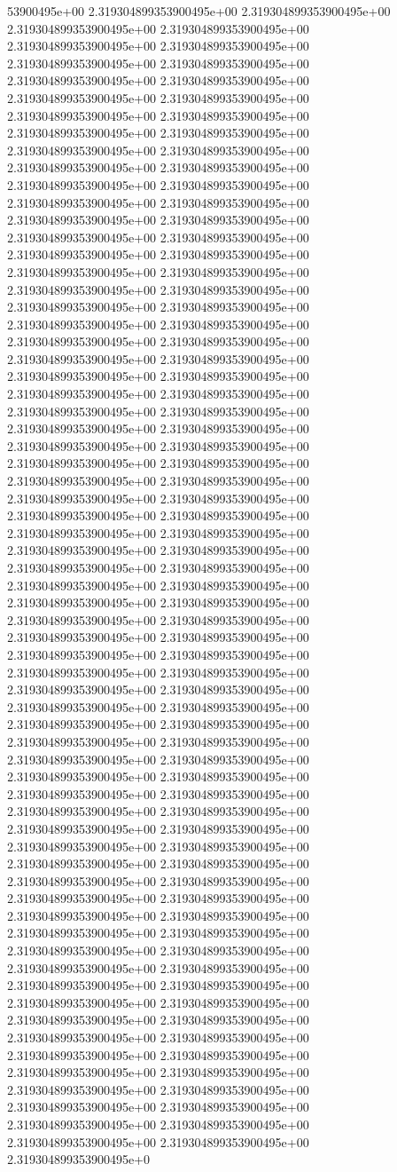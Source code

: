 53900495e+00	2.319304899353900495e+00	2.319304899353900495e+00	2.319304899353900495e+00	2.319304899353900495e+00	2.319304899353900495e+00	2.319304899353900495e+00	2.319304899353900495e+00	2.319304899353900495e+00	2.319304899353900495e+00	2.319304899353900495e+00	2.319304899353900495e+00	2.319304899353900495e+00	2.319304899353900495e+00	2.319304899353900495e+00	2.319304899353900495e+00	2.319304899353900495e+00	2.319304899353900495e+00	2.319304899353900495e+00	2.319304899353900495e+00	2.319304899353900495e+00	2.319304899353900495e+00	2.319304899353900495e+00	2.319304899353900495e+00	2.319304899353900495e+00	2.319304899353900495e+00	2.319304899353900495e+00	2.319304899353900495e+00	2.319304899353900495e+00	2.319304899353900495e+00	2.319304899353900495e+00	2.319304899353900495e+00	2.319304899353900495e+00	2.319304899353900495e+00	2.319304899353900495e+00	2.319304899353900495e+00	2.319304899353900495e+00	2.319304899353900495e+00	2.319304899353900495e+00	2.319304899353900495e+00	2.319304899353900495e+00	2.319304899353900495e+00	2.319304899353900495e+00	2.319304899353900495e+00	2.319304899353900495e+00	2.319304899353900495e+00	2.319304899353900495e+00	2.319304899353900495e+00	2.319304899353900495e+00	2.319304899353900495e+00	2.319304899353900495e+00	2.319304899353900495e+00	2.319304899353900495e+00	2.319304899353900495e+00	2.319304899353900495e+00	2.319304899353900495e+00	2.319304899353900495e+00	2.319304899353900495e+00	2.319304899353900495e+00	2.319304899353900495e+00	2.319304899353900495e+00	2.319304899353900495e+00	2.319304899353900495e+00	2.319304899353900495e+00	2.319304899353900495e+00	2.319304899353900495e+00	2.319304899353900495e+00	2.319304899353900495e+00	2.319304899353900495e+00	2.319304899353900495e+00	2.319304899353900495e+00	2.319304899353900495e+00	2.319304899353900495e+00	2.319304899353900495e+00	2.319304899353900495e+00	2.319304899353900495e+00	2.319304899353900495e+00	2.319304899353900495e+00	2.319304899353900495e+00	2.319304899353900495e+00	2.319304899353900495e+00	2.319304899353900495e+00	2.319304899353900495e+00	2.319304899353900495e+00	2.319304899353900495e+00	2.319304899353900495e+00	2.319304899353900495e+00	2.319304899353900495e+00	2.319304899353900495e+00	2.319304899353900495e+00	2.319304899353900495e+00	2.319304899353900495e+00	2.319304899353900495e+00	2.319304899353900495e+00	2.319304899353900495e+00	2.319304899353900495e+00	2.319304899353900495e+00	2.319304899353900495e+00	2.319304899353900495e+00	2.319304899353900495e+00	2.319304899353900495e+00	2.319304899353900495e+00	2.319304899353900495e+00	2.319304899353900495e+00	2.319304899353900495e+00	2.319304899353900495e+00	2.319304899353900495e+00	2.319304899353900495e+00	2.319304899353900495e+00	2.319304899353900495e+00	2.319304899353900495e+00	2.319304899353900495e+00	2.319304899353900495e+00	2.319304899353900495e+00	2.319304899353900495e+00	2.319304899353900495e+00	2.319304899353900495e+00	2.319304899353900495e+00	2.319304899353900495e+00	2.319304899353900495e+00	2.319304899353900495e+00	2.319304899353900495e+00	2.319304899353900495e+00	2.319304899353900495e+00	2.319304899353900495e+00	2.319304899353900495e+00	2.319304899353900495e+00	2.319304899353900495e+00	2.319304899353900495e+00	2.319304899353900495e+00	2.319304899353900495e+00	2.319304899353900495e+00	2.319304899353900495e+00	2.319304899353900495e+0